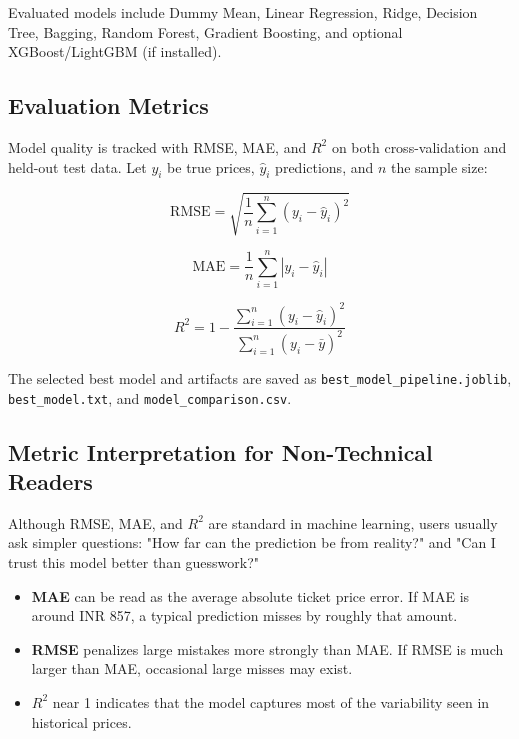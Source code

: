 \documentclass[conference]{IEEEtran}
\begin{document}
Evaluated models include Dummy Mean, Linear Regression, Ridge, Decision Tree, Bagging, Random Forest, Gradient Boosting, and optional XGBoost/LightGBM (if installed).

\subsection{Evaluation Metrics}
Model quality is tracked with RMSE, MAE, and $R^2$ on both cross-validation and held-out test data. Let $y_i$ be true prices, $\hat{y}_i$ predictions, and $n$ the sample size:

\begin{equation}
\mathrm{RMSE} = \sqrt{\frac{1}{n}\sum_{i=1}^{n}(y_i - \hat{y}_i)^2}
\end{equation}

\begin{equation}
\mathrm{MAE} = \frac{1}{n}\sum_{i=1}^{n}|y_i - \hat{y}_i|
\end{equation}

\begin{equation}
R^2 = 1 - \frac{\sum_{i=1}^{n}(y_i-\hat{y}_i)^2}{\sum_{i=1}^{n}(y_i-\bar{y})^2}
\end{equation}

The selected best model and artifacts are saved as \texttt{best\_model\_pipeline.joblib}, \texttt{best\_model.txt}, and \texttt{model\_comparison.csv}.

\subsection{Metric Interpretation for Non-Technical Readers}
Although RMSE, MAE, and $R^2$ are standard in machine learning, users usually ask simpler questions: "How far can the prediction be from reality?" and "Can I trust this model better than guesswork?"

\begin{itemize}
\item \textbf{MAE} can be read as the average absolute ticket price error. If MAE is around INR 857, a typical prediction misses by roughly that amount.
\item \textbf{RMSE} penalizes large mistakes more strongly than MAE. If RMSE is much larger than MAE, occasional large misses may exist.
\item \textbf{$R^2$} near 1 indicates that the model captures most of the variability seen in historical prices.
\end{itemize}
\end{document}
